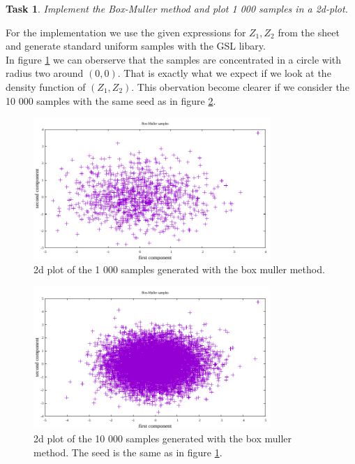 \documentclass{scrartcl}
\newtheorem{task}{Task}
\begin{document}
	\begin{task}
		Implement the Box-Muller method and plot 1 000 samples in a 2d-plot.
	\end{task}
	For the implementation we use the given expressions for $Z_1, Z_2$ from the sheet and generate standard uniform samples with the GSL libary. \\
	In figure \ref{fig_box_muller_1000} we can oberserve that the samples are concentrated in a circle with radius two around $(0,0)$. That is exactly what we expect if we look at the density function of $(Z_1, Z_2)$. This obervation become clearer if we consider the 10 000 samples with the same seed as in figure \ref{fig_box_muller_10000}.
	\begin{figure}[h]
		\centering
		\includegraphics[width=0.8\textwidth]{Box-Muller}
		\caption{2d plot of the 1 000 samples generated with the box muller method.}
		\label{fig_box_muller_1000}
	\end{figure}
	\begin{figure}[h]
		\centering
		\includegraphics[width=0.8\textwidth]{Box-Muller_10000_samples}
		\caption{2d plot of the 10 000 samples generated with the box muller method. The seed is the same as in figure \ref{fig_box_muller_1000}.}
		\label{fig_box_muller_10000}
	\end{figure}
	
\end{document}
